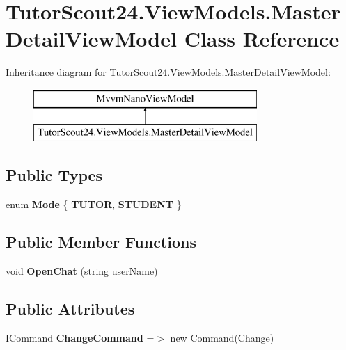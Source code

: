 \hypertarget{class_tutor_scout24_1_1_view_models_1_1_master_detail_view_model}{}\section{Tutor\+Scout24.\+View\+Models.\+Master\+Detail\+View\+Model Class Reference}
\label{class_tutor_scout24_1_1_view_models_1_1_master_detail_view_model}
Inheritance diagram for Tutor\+Scout24.\+View\+Models.\+Master\+Detail\+View\+Model\+:\begin{figure}[H]
\begin{center}
\leavevmode
\includegraphics[height=2.000000cm]{class_tutor_scout24_1_1_view_models_1_1_master_detail_view_model}
\end{center}
\end{figure}
\subsection*{Public Types}
\begin{DoxyCompactItemize}
\item 
\mbox{\label{class_tutor_scout24_1_1_view_models_1_1_master_detail_view_model_a8a0ee549097202134d10cb228a32ab1a}} 
enum {\bfseries Mode} \{ {\bfseries T\+U\+T\+OR}, 
{\bfseries S\+T\+U\+D\+E\+NT}
 \}
\end{DoxyCompactItemize}
\subsection*{Public Member Functions}
\begin{DoxyCompactItemize}
\item 
\mbox{\label{class_tutor_scout24_1_1_view_models_1_1_master_detail_view_model_a471f3c616872c0a2412b9d7bd778441d}} 
void {\bfseries Open\+Chat} (string user\+Name)
\end{DoxyCompactItemize}
\subsection*{Public Attributes}
\begin{DoxyCompactItemize}
\item 
\mbox{\label{class_tutor_scout24_1_1_view_models_1_1_master_detail_view_model_af31730bb9c29fcbca2c2ba1d89f731e0}} 
I\+Command {\bfseries Change\+Command} =$>$ new Command(Change)
\end{DoxyCompactItemize}
